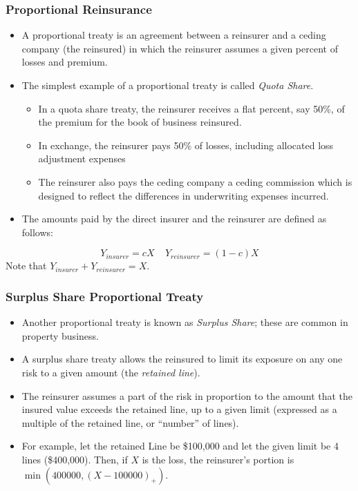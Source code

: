 \documentclass{beamer}
\begin{document}
\begin{frame}%
\frametitle{Proportional Reinsurance}
\begin{itemize}
 \item A proportional treaty is an agreement between a reinsurer and a ceding company (the reinsured) in which the reinsurer assumes a given percent of losses and premium.
\item The simplest example of a proportional treaty is called \textit{Quota Share}.
\begin{itemize}
 \item In a quota share treaty, the reinsurer receives a flat percent, say 50\%, of the premium for the book of business reinsured.
 \item In exchange, the reinsurer pays 50\% of losses, including allocated loss adjustment expenses
 \item The reinsurer also pays the ceding company a ceding commission which is designed to reflect the differences in underwriting expenses incurred.
\end{itemize}
\item The amounts paid by the direct insurer and the reinsurer are defined as follows:
\end{itemize}
$$ Y_{insurer} = c X \ \ \ \ \ Y_{reinsurer} = (1-c) X$$
Note that $Y_{insurer}+Y_{reinsurer}=X$.
\end{frame}

\begin{frame}%
\frametitle{Surplus Share Proportional Treaty}
\begin{itemize}
\item Another proportional treaty is known as \textit{Surplus Share}; these are common in property business.
\item A surplus share treaty allows the reinsured to limit its exposure on any one risk to a given amount (the \textit{retained line}).
\item The reinsurer assumes a part of the risk in proportion to the amount that the insured value exceeds the retained line, up to a given limit (expressed as a multiple of the retained line, or ``number'' of lines).
\item For example, let the retained Line be \$100,000 and let the given limit be 4 lines (\$400,000). Then, if $X$ is the loss, the reinsurer's portion is
$\min(400000, (X-100000)_+)$.
\end{itemize}
\end{frame}
\end{document}

